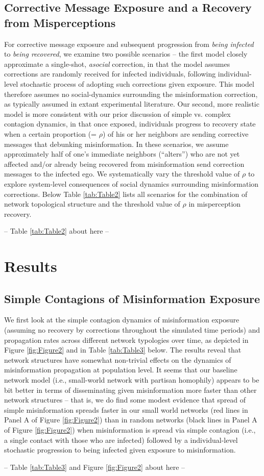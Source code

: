 \documentclass[man, 12pt, a4paper, nolmodern, noextraspace]{apa6}
\begin{document}
\subsection{Corrective Message Exposure and a Recovery from Misperceptions}
  For corrective message exposure and subsequent progression from \emph{being infected} to \emph{being recovered}, we examine two possible scenarios -- the first model closely approximate a single-shot, \emph{asocial} correction, in that the model assumes  corrections are randomly received for infected individuals, following individual-level stochastic process of adopting such corrections given exposure. This model therefore assumes no social-dynamics surrounding the misinformation correction, as typically assumed in extant experimental literature. Our second, more realistic model is more consistent with our prior discussion of simple vs. complex contagion dynamics, in that once exposed, individuals progress to recovery state when a certain proportion (= $\rho$) of his or her neighbors are sending corrective messages that debunking misinformation. In these scenarios, we assume approximately half of one's immediate neighbors (\enquote{alters}) who are not yet affected and/or already being recovered from misinformation send correction messages to the infected ego. We systematically vary the threshold value of $\rho$ to explore system-level consequences of social dynamics surrounding misinformation corrections. Below Table \ref{tab:Table2} lists all scenarios for the combination of network topological structure and the threshold value of $\rho$ in misperception recovery. 
\centerline{ -- Table \ref{tab:Table2} about here -- }  

\section{Results}
\subsection{Simple Contagions of Misinformation Exposure}
  We first look at the simple contagion dynamics of misinformation exposure (assuming no recovery by corrections throughout the simulated time periods) and propagation rates across different network typologies over time, as depicted in Figure \ref{fig:Figure2} and in Table \ref{tab:Table3} below. The results reveal that network structures have somewhat non-trivial effects on the dynamics of misinformation propagation at population level. It seems that our baseline network model (i.e., small-world network with partisan homophily) appears to be bit better in terms of disseminating given misinformation more faster than other network structures -- that is, we do find some modest evidence that spread of simple misinformation spreads faster in our small world networks (red lines in Panel A of Figure \ref{fig:Figure2}) than in random networks (black lines in Panel A of Figure \ref{fig:Figure2}) when misinformation is spread via simple contagion (i.e., a single contact with those who are infected) followed by a individual-level stochastic progression to being infected given exposure to misinformation. 
\centerline{ -- Table \ref{tab:Table3} and Figure \ref{fig:Figure2} about here -- }  
\end{document}
